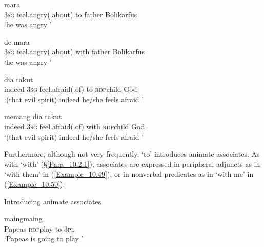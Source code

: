\ea
\label{Example_10.47}
\ea
\label{Example_10.47a}
 {mara} {} {} {}\\ %
   \textsc{3sg}  feel.angry(.about)  to  father  Bolikarfus\\
\glt ‘he was angry ’ \textstyleExampleSource{[081014-016-Cv.0042]}
\vspace{5pt}

\ex
\label{Example_10.47b}
\gll  de  mara      \\
   \textsc{3sg}  feel.angry(.about)  with  father  Bolikarfus\\
\glt ‘he was angry ’ \textstyleExampleSource{[Elicited BR120817.001]}
\z
\z


\ea
\label{Example_10.48}
\ea
\label{Example_10.48a}
 {dia} {takut} {} {} {}\\ %
   indeed  \textsc{3sg}  feel.afraid(.of)  to  \textsc{rdp}{\Tilde}child  God\\
\glt ‘(that evil spirit) indeed he/she feels afraid ’ \textstyleExampleSource{[081006-022-CvEx.0175]}
\vspace{5pt}

\ex
\label{Example_10.48b}
\gll  memang  dia  takut      \\
   indeed  \textsc{3sg}  feel.afraid(.of)  with  \textsc{rdp}{\Tilde}child  God\\
\glt ‘(that evil spirit) indeed he/she feels afraid ’ \textstyleExampleSource{[Elicited BR120817.001]}
\z
\z



Furthermore, although not very frequently,  ‘to’ introduces animate associates. As with   ‘with’ (§\ref{Para_10.2.1}), associates are expressed in peripheral adjuncts as in  ‘with them’ in (\ref{Example_10.49}), or in nonverbal predicates as in  ‘with me’ in (\ref{Example_10.50}).


\begin{styleExampleTitle}
Introducing animate associates
\end{styleExampleTitle}

\ea
\label{Example_10.49}
 {maing{\Tilde}maing} {} {}\\ %
 Papeas  \textsc{rdp}{\Tilde}play  to  \textsc{3pl}\\
\glt 
‘Papeas is going to play ’ \textstyleExampleSource{[080918-001-CvNP.0040]}
\z

